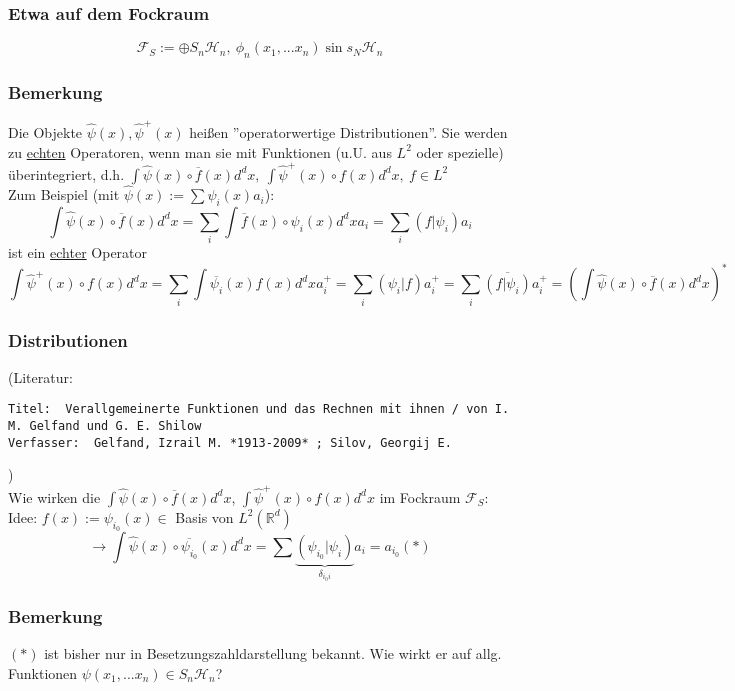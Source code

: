 \documentclass[twoside,a4paper]{scrartcl}
\newcommand{\R}{\mathbb{R}}
\renewcommand{\1}{\mathds{1}}
\newcommand{\ra}{\rightarrow}
\renewcommand{\H}{\mathcal{H}}
\newcommand{\F}{\mathcal{F}}
\renewcommand{\R}{\mathbb{R}}
\begin{document}
\subsubsection*{Etwa auf dem Fockraum}
$$\F_S:= \oplus S_n\H_n, \ \phi_n(x_1,...x_n) \sin s_N \H_n$$
\subsubsection*{Bemerkung}
Die Objekte $\hat \psi(x), \hat \psi^+(x)$ heißen ''operatorwertige Distributionen''. Sie werden zu \underline{echten} Operatoren, wenn man sie mit Funktionen (u.U. aus $L^2$ oder spezielle) überintegriert, d.h. 
$\int \hat \psi(x) \circ \overline{f}(x) d^dx, \ \int \hat \psi^+(x) \circ {f}(x) d^dx, \ f \in L^2$\\
Zum Beispiel (mit $\hat \psi(x):= \sum \psi_i(x)a_i$):
$$\int \hat \psi(x) \circ \overline{f}(x) d^dx=\sum_i \int \overline{f}(x) \circ \psi_i(x) d^dx a_i=\sum_i (f|\psi_i)a_i$$
ist ein \underline{echter} Operator
$$\int \hat \psi^+(x) \circ {f}(x) d^dx=\sum_i \int \overline{\psi_i}(x) {f}(x)  d^dx a^+_i=\sum_i (\psi_i|f)a^+_i=\sum_i \overline{(f|\psi_i)}a^+_i=(\int \hat \psi(x) \circ \overline{f}(x) d^dx)^*$$

\subsubsection*{Distributionen}
(Literatur: \begin{tiny}
\begin{verbatim}
Titel: 	Verallgemeinerte Funktionen und das Rechnen mit ihnen / von I. M. Gelfand und G. E. Shilow
Verfasser: 	Gelfand, Izrail M. *1913-2009* ; Silov, Georgij E.
\end{verbatim}
\end{tiny}
)\\
Wie wirken die $\int \hat \psi(x) \circ \overline{f}(x) d^dx$, $\int \hat \psi^+(x) \circ {f}(x) d^dx$ im Fockraum $\F_S$:\\
Idee: $f(x):= \psi_{i_0}(x) \in$ Basis von $L^2(\R^d)$\\
$$\ra \int \hat \psi(x) \circ \overline{\psi_{i_0}}(x) d^dx=\sum \underbrace{(\psi_{i_0}|\psi_i)}_{\delta_{i_0i}}a_i=a_{i_0} (*) $$
\subsubsection*{Bemerkung}
$(*)$ ist bisher nur in Besetzungszahldarstellung bekannt. Wie wirkt er auf allg. Funktionen $\psi(x_1,...x_n) \in S_n\H_n$?
\end{document}
